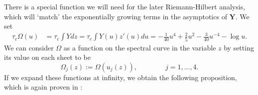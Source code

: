 \documentclass[usenames,dvipsnames]{article}
\theoremstyle{definition}
\numberwithin{equation}{section}
\numberwithin{figure}{section}
\begin{document}
There is a special function we will need for the later Riemann-Hilbert analysis, which will `match' the exponentially growing terms in
the asymptotics of $\boldsymbol{Y}$. We set
    \begin{align}
        \tau_c \Omega(u) &= \tau_c \int Y dz = \tau_c \int Y(u) z'(u) du =  -\frac{1}{40}u^4 + \frac{2}{5}u^2 -\frac{3}{40}u^{-4} - \log u.\label{Omega-uniformizer}
    \end{align}
We can consider $\Omega$ as a function on the spectral curve in the variable $z$ by setting its value on each sheet to be
    \begin{equation}
        \Omega_j(z) := \Omega(u_j(z)),\qquad\qquad j = 1,...,4.
    \end{equation}
If we expand these functions at infinity, we obtain the following proposition, which is again proven in \cite{DHL1}:
\end{document}
